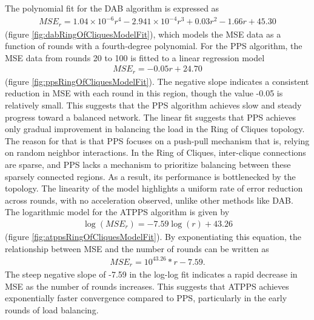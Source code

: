 The polynomial fit for the DAB algorithm is expressed as
\begin{align}
    MSE_r=1.04\times 10^{-6}r^{4}-2.941\times 10^{-4}r^{3}+0.03r^{2}-1.66r+45.30    
\end{align}
(figure \ref{fig:dabRingOfCliquesModelFit}), which models the MSE data as a function of rounds with a fourth-degree polynomial. For the PPS algorithm, the MSE data from rounds 20 to 100 is fitted to a linear regression model 
\begin{align}
    MSE_r=-0.05r+24.70
\end{align}
(figure \ref{fig:ppsRingOfCliquesModelFit}). The negative slope indicates a consistent reduction in MSE with each round in this region, though the value -0.05 is relatively small. This suggests that the PPS algorithm achieves slow and steady progress toward a balanced network. The linear fit suggests that PPS achieves only gradual improvement in balancing the load in the Ring of Cliques topology. The reason for that is that PPS focuses on a push-pull mechanism that is, relying on random neighbor interactions. In the Ring of Cliques, inter-clique connections are sparse, and PPS lacks a mechanism to prioritize balancing between these sparsely connected regions. As a result, its performance is bottlenecked by the topology. The linearity of the model highlights a uniform rate of error reduction across rounds, with no acceleration observed, unlike other methods like DAB. The logarithmic model for the ATPPS algorithm is given by 
\begin{align}
    \log{(MSE_r)}=-7.59\log{(r)}+43.26   
\end{align}
(figure \ref{fig:atppsRingOfCliquesModelFit}). By exponentiating this equation, the relationship between MSE and the number of rounds can be written as
\begin{align}
    MSE_r=10^{43.26}*r-7.59.    
\end{align}
The steep negative slope of -7.59 in the log-log fit indicates a rapid decrease in MSE as the number of rounds increases. This suggests that ATPPS achieves exponentially faster convergence compared to PPS, particularly in the early rounds of load balancing.

